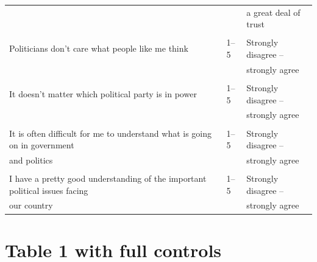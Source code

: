 \documentclass[12pt, letter]{article}
\begin{document}
\begin{center}
\begin{longtable}{lll}
 &  &  a great deal of trust \\
 \\[-4pt]
Politicians don’t care what people like me think & 1--5 & Strongly disagree --  \\
 &  &  strongly agree\\
 \\[-4pt]
It doesn’t matter which political party is in power & 1--5 & Strongly disagree -- \\
 &  &  strongly agree\\
 \\[-4pt]
It is often difficult for me to understand what is going on in government  & 1--5 & Strongly disagree -- \\
and politics && strongly agree\\
 \\[-4pt]
I have a pretty good understanding of the important political issues facing  & 1--5 & Strongly disagree --\\
our country && strongly agree\\
\toprule[1.5pt]
\end{longtable}
\end{center}


\section{Table 1 with full controls} \label{appendixshorttermfull}
\end{document}
